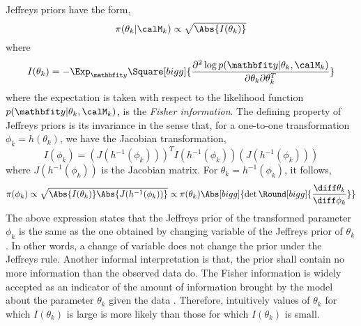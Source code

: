 Jeffreys priors \cite{Jeffreys:1946jf} have the form,
\begin{equation}
  \pi(\theta_k|\calM_k)\propto\sqrt{\Abs{I(\theta_k)}}
\end{equation}
where
\begin{equation}
  I(\theta_k)
  = -\Exp_{\data}\Square[bigg]{\frac{\partial^2\log p(\data|\theta_k,\calM_k)}
    {\partial\theta_k\partial\theta_k^T}}
\end{equation}
where the expectation is taken with respect to the likelihood function
$p(\data|\theta_k,\calM_k)$, is the \emph{Fisher information}. The defining
property of Jeffreys priors is its invariance in the sense that, for a
one-to-one transformation $\phi_k = h(\theta_k)$, we have the Jacobian
transformation,
\begin{equation*}
  I(\phi_k) = (J(h^{-1}(\phi_k)))^T I(h^{-1}(\phi_k)) 
  (J(h^{-1}(\phi_k)))
\end{equation*}
where $J(h^{-1}(\phi_k))$ is the Jacobian matrix. For $\theta_k =
h^{-1}(\phi_k)$, it follows,
\begin{equation*}
  \pi(\phi_k)
  \propto \sqrt{\Abs{I(\theta_k)}\Abs{J(h^{-1}(\phi_k))}}
  \propto \pi(\theta_k)
  \Abs[bigg]{\det\Round[bigg]{\frac{\diff\theta_k}{\diff\phi_k}}}
\end{equation*}
The above expression states that the Jeffreys prior of the transformed
parameter $\phi_k$ is the same as the one obtained by changing variable of
the Jeffreys prior of $\theta_k$. In other words, a change of variable does
not change the prior under the Jeffreys rule. Another informal interpretation
is that, the prior shall contain no more information than the observed data
do. The Fisher information is widely accepted as an indicator of the amount
of information brought by the model about the parameter $\theta_k$ given the
data \cite{Fisher:1956vx}. Therefore, intuitively values of $\theta_k$ for
which $I(\theta_k)$ is large is more likely than those for which
$I(\theta_k)$ is small.


